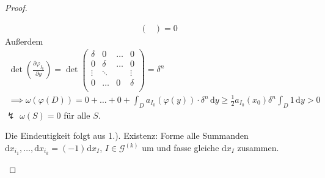 \documentclass[a4paper,10pt]{scrbook}
\begin{document}
\begin{theorem}[Satz]
\begin{proof}
\begin{enum-arab}
\begin{gather*}
\begin{pmatrix}
        \end{pmatrix} = 0
      \end{gather*}
      Außerdem
      \begin{gather*}
        \det \left( \frac{\partial \varphi_{I_0}}{\partial y} \right) =
        \det
        \begin{pmatrix}
          \delta & 0 & \ldots & 0 \\
          0 & \delta & \ldots & 0 \\
          \vdots & \ddots & & \vdots \\
          0 & \ldots & 0 & \delta \\
        \end{pmatrix}
        = \delta^n \\
        \implies \omega(\varphi(D)) = 0 + \ldots + 0 + \int_D a_{I_0}(\varphi(y)) \cdot \delta^n \, \mathrm{d}y \geq \frac{1}{2} a_{I_0}(x_0) \delta^n \int_D 1 \, \mathrm{d}y > 0
      \end{gather*}
      $\lightning$ $\omega(S) = 0$ für alle $S$.

      \item Die Eindeutigkeit folgt aus 1.). Existenz: Forme alle Summanden $\mathrm{d}x_{i_1} ,\ldots, \mathrm{d}x_{i_k} = (-1)^{} \mathrm{d}x_I$, $I \in \mathcal{G}^{(k)}$ um und fasse gleiche $\mathrm{d}x_I$ zusammen.
    \end{enum-arab}
  \end{proof}
\end{theorem}
\end{document}
